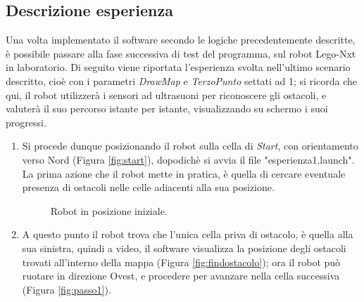 \documentclass[english]{article}
\begin{document}
\subsection{Descrizione esperienza}
Una volta implementato il software secondo le logiche precedentemente descritte, è possibile passare alla fase successiva di test del programma, sul robot Lego-Nxt in laboratorio. Di seguito viene riportata l'esperienza svolta nell'ultimo scenario descritto, cioè con i parametri \textit{DrawMap} e \textit{TerzoPunto} settati ad 1; si ricorda che qui, il robot utilizzerà i sensori ad ultrasuoni per riconoscere gli ostacoli, e valuterà il suo percorso istante per istante, visualizzando su schermo i suoi progressi.  
\begin{enumerate}
\item Si procede dunque posizionando il robot sulla cella di \textit{Start}, con orientamento verso Nord (Figura \ref{fig:start}), dopodichè si avvia il file "esperienza1.launch". La prima azione che il robot mette in pratica, è quella di cercare eventuale presenza di ostacoli nelle celle adiacenti alla sua posizione. 
\begin{figure}[!ht]
\centering
{}
\caption{Robot in posizione iniziale.}
\end{figure}
\item A questo punto il robot trova che l'unica cella priva di ostacolo, è quella alla sua sinistra, quindi a video, il software visualizza la posizione degli ostacoli trovati all'interno della mappa (Figura \ref{fig:findostacolo}); ora il robot può ruotare in direzione Ovest, e procedere per avanzare nella cella successiva (Figura \ref{fig:passo1}).

\end{enumerate}
\end{document}
